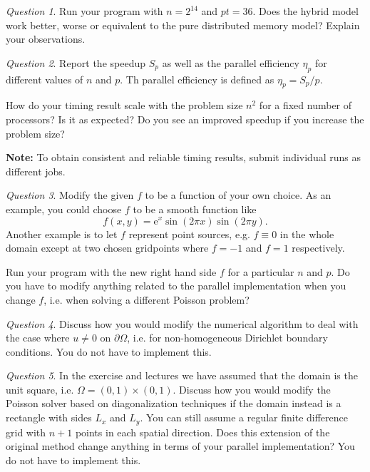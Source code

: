 \documentclass[onecolumn, oneside, a4paper, 11pt]{memoir}
\theoremstyle{remark}
\newtheorem{ex}{Question}
\begin{document}
\bigskip
\begin{ex}
  Run your program with $n=2^{14}$ and $pt=36$. Does the hybrid model work better, worse
  or equivalent to the pure distributed memory model? Explain your observations.
\end{ex}

\bigskip
\begin{ex}
  Report the speedup $S_p$ as well as the parallel efficiency $\eta_p$ for
  different values of $n$ and $p$. Th parallel efficiency is defined as
  $\eta_p = S_p / p$.

  How do your timing result scale with the problem size $n^2$ for a fixed number
  of processors? Is it as expected? Do you see an improved speedup if you
  increase the problem size?

  \textbf{Note:} To obtain consistent and reliable timing results, submit
  individual runs as different jobs.
\end{ex}

\bigskip
\begin{ex}
  Modify the given $f$ to be a function of your own choice. As an example, you
  could choose $f$ to be a smooth function like
  \[
    f(x, y) = \text{e}^x \sin(2\pi x) \sin(2 \pi y).
  \]
  Another example is to let $f$ represent point sources, e.g. $f \equiv 0$ in
  the whole domain except at two chosen gridpoints where $f=-1$ and $f=1$
  respectively.

  Run your program with the new right hand side $f$ for a particular $n$ and
  $p$. Do you have to modify anything related to the parallel implementation
  when you change $f$, i.e. when solving a different Poisson problem?
\end{ex}

\bigskip
\begin{ex}
  Discuss how you would modify the numerical algorithm to deal with the case
  where $u \not= 0$ on $\partial\Omega$, i.e. for non-homogeneous Dirichlet
  boundary conditions. You do not have to implement this.
\end{ex}

\bigskip
\begin{ex}
  In the exercise and lectures we have assumed that the domain is the unit
  square, i.e. $\Omega = (0,1) \times (0,1)$. Discuss how you would modify the
  Poisson solver based on diagonalization techniques if the domain instead is a
  rectangle with sides $L_x$ and $L_y$. You can still assume a regular finite
  difference grid with $n+1$ points in each spatial direction. Does this
  extension of the original method change anything in terms of your parallel
  implementation? You do not have to implement this.
\end{ex}
\end{document}
